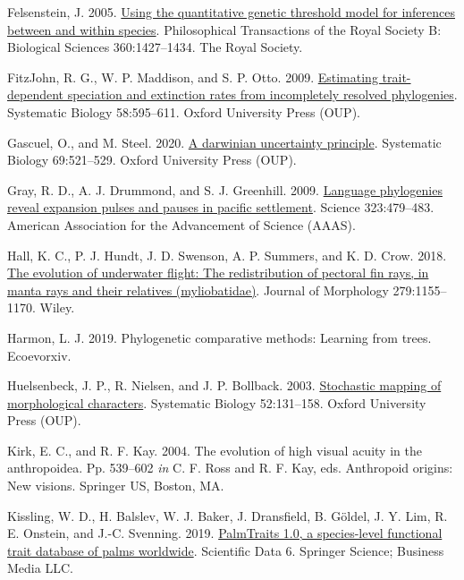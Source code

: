 \documentclass{article}
\newlength{\cslhangindent}
\newenvironment{CSLReferences}[2] %
 {\begin{list}{}{%
  \setlength{\itemindent}{0pt}
  \setlength{\leftmargin}{0pt}
  \setlength{\parsep}{0pt}
  \ifodd #1
   \setlength{\leftmargin}{\cslhangindent}
   \setlength{\itemindent}{-1\cslhangindent}
  \fi
  \setlength{\itemsep}{#2\baselineskip}}}
 {\end{list}}
\begin{document}
\begin{CSLReferences}{1}{0}
Felsenstein, J. 2005. \href{https://doi.org/10.1098/rstb.2005.1669}{Using the quantitative genetic threshold model for inferences between and within species}. Philosophical Transactions of the Royal Society B: Biological Sciences 360:1427--1434. The Royal Society.

FitzJohn, R. G., W. P. Maddison, and S. P. Otto. 2009. \href{https://doi.org/10.1093/sysbio/syp067}{Estimating trait-dependent speciation and extinction rates from incompletely resolved phylogenies}. Systematic Biology 58:595--611. Oxford University Press (OUP).

Gascuel, O., and M. Steel. 2020. \href{https://doi.org/10.1093/sysbio/syz054}{A darwinian uncertainty principle}. Systematic Biology 69:521--529. Oxford University Press (OUP).

Gray, R. D., A. J. Drummond, and S. J. Greenhill. 2009. \href{https://doi.org/10.1126/science.1166858}{Language phylogenies reveal expansion pulses and pauses in pacific settlement}. Science 323:479--483. American Association for the Advancement of Science (AAAS).

Hall, K. C., P. J. Hundt, J. D. Swenson, A. P. Summers, and K. D. Crow. 2018. \href{https://doi.org/10.1002/jmor.20837}{The evolution of underwater flight: The redistribution of pectoral fin rays, in manta rays and their relatives (myliobatidae)}. Journal of Morphology 279:1155--1170. Wiley.

Harmon, L. J. 2019. Phylogenetic comparative methods: Learning from trees. Ecoevorxiv.

Huelsenbeck, J. P., R. Nielsen, and J. P. Bollback. 2003. \href{https://doi.org/10.1080/10635150390192780}{Stochastic mapping of morphological characters}. Systematic Biology 52:131--158. Oxford University Press (OUP).

Kirk, E. C., and R. F. Kay. 2004. The evolution of high visual acuity in the anthropoidea. Pp. 539--602 \emph{in} C. F. Ross and R. F. Kay, eds. Anthropoid origins: New visions. Springer US, Boston, MA.

Kissling, W. D., H. Balslev, W. J. Baker, J. Dransfield, B. Göldel, J. Y. Lim, R. E. Onstein, and J.-C. Svenning. 2019. \href{https://doi.org/10.1038/s41597-019-0189-0}{PalmTraits 1.0, a species-level functional trait database of palms worldwide}. Scientific Data 6. Springer Science; Business Media LLC.


\end{CSLReferences}
\end{document}
